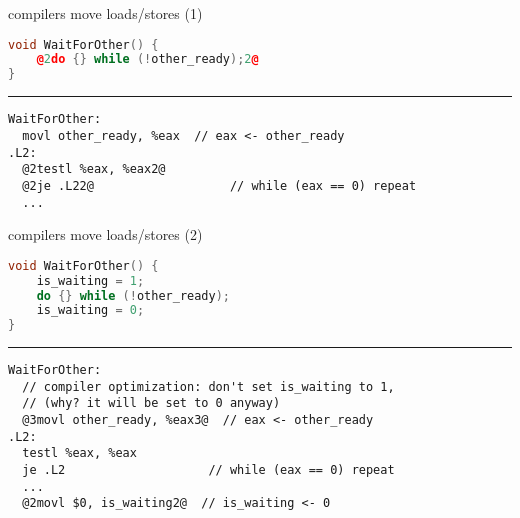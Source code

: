 \begin{frame}[fragile,label=compReorder]{compilers move loads/stores (1)}
\begin{lstlisting}[language=C++,style=small,
    moredelim={**[is][\btHL<2|handout:2>]{@2}{2@}},
    moredelim={**[is][\btHL<3|handout:3>]{@3}{3@}},
    moredelim={**[is][\btHL<4|handout:4>]{@4}{4@}},
    moredelim={**[is][\btHL<5|handout:5>]{@5}{5@}},
]
void WaitForOther() {
    @2do {} while (!other_ready);2@
}
\end{lstlisting}
\hrule
\begin{lstlisting}[language=myasm,style=smaller,
    moredelim={**[is][\btHL<2|handout:2>]{@2}{2@}},
    moredelim={**[is][\btHL<3|handout:3>]{@3}{3@}},
    moredelim={**[is][\btHL<4|handout:4>]{@4}{4@}},
    moredelim={**[is][\btHL<5|handout:5>]{@5}{5@}},
]
WaitForOther:
  movl other_ready, %eax  // eax <- other_ready
.L2:
  @2testl %eax, %eax2@
  @2je .L22@                   // while (eax == 0) repeat
  ...
\end{lstlisting}
\end{frame}

\begin{frame}[fragile,label=compReorder2]{compilers move loads/stores (2)}
\begin{lstlisting}[language=C++,style=small,
    moredelim={**[is][\btHL<2|handout:2>]{@2}{2@}},
    moredelim={**[is][\btHL<3|handout:3>]{@3}{3@}},
    moredelim={**[is][\btHL<4|handout:4>]{@4}{4@}},
    moredelim={**[is][\btHL<5|handout:5>]{@5}{5@}},
]
void WaitForOther() {
    is_waiting = 1;
    do {} while (!other_ready);
    is_waiting = 0;
}
\end{lstlisting}
\hrule
\begin{lstlisting}[language=myasm,style=small,
    moredelim={**[is][\btHL<2|handout:2>]{@2}{2@}},
    moredelim={**[is][\btHL<3|handout:3>]{@3}{3@}},
    moredelim={**[is][\btHL<4|handout:4>]{@4}{4@}},
    moredelim={**[is][\btHL<5|handout:5>]{@5}{5@}},
]
WaitForOther:  
  // compiler optimization: don't set is_waiting to 1,
  // (why? it will be set to 0 anyway)
  @3movl other_ready, %eax3@  // eax <- other_ready
.L2:
  testl %eax, %eax          
  je .L2                    // while (eax == 0) repeat
  ...
  @2movl $0, is_waiting2@  // is_waiting <- 0
\end{lstlisting}
\end{frame}
